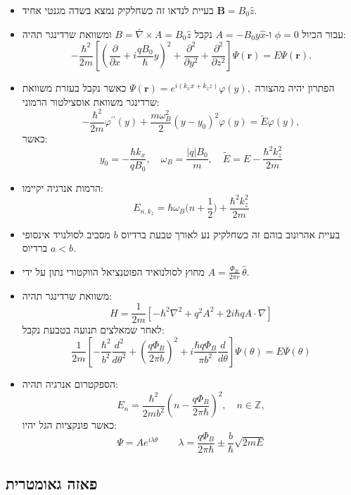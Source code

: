 \documentclass{tstextbook}
\begin{document}
\begin{summary}
  \begin{itemize}
    \item בעיית לנדאו זה כשחלקיק נמצא בשדה מגנטי אחיד \(\mathbf{B}=B_{0}\hat{z}\).
    \item עבור הכיול \(\phi=0\) ו-\(A=-B_{0}y\hat{x}\) נקבל \(B=\bar{\nabla} \times A=B_{0}\hat{z}\) ומשוואת שרדינגר תהיה:
$$-\frac{\hbar^{2}}{2m}\left[\left(\frac{\partial}{\partial x}+i\frac{q B_{0}}{\hbar}y\right)^{2}+\frac{\partial^{2}}{\partial y^{2}}+\frac{\partial^{2}}{\partial z^{2}}\right]\Psi(\mathbf{r})=E\Psi(\mathbf{r}).$$
    \item הפתרון יהיה מהצורה \(\Psi(\mathbf{r})=e^{i(k_{x}x+k_{z}z)}\varphi(y),\) כאשר נקבל בעזרת משוואת שרדינגר משוואת אוסצילטור הרמוני:
$$-\frac{\hbar^{2}}{2m}\varphi^{\prime\prime}(y)+\frac{m\omega_{B}^{2}}{2}(y-y_{0})^{2}\varphi(y)=\tilde{E}\varphi(y),$$
כאשר:
$$y_{0}=-\frac{\hbar k_{x}}{q B_{0}},\quad\omega_{B}=\frac{|q|B_{0}}{m},\quad\tilde{E}=E-\frac{\hbar^{2}k_{z}^{2}}{2m}$$
    \item הרמות אנרגיה יקיימו:
$$E_{n,k_{z}}=\hbar\omega_{B}\Big(n+\frac{1}{2}\Big)+\frac{\hbar^{2}k_{z}^{2}}{2m}$$
    \item בעיית אהרונוב בוהם זה כשחלקיק נע לאורך טבעת ברדיוס \(b\) מסביב לסולנויד אינסופי ברדיוס \(a<b\).
    \item מחוץ לסולנואיד הפוטנציאל הווקטורי נתון על ידי \(A=\frac{\Phi_{B}}{2\pi r}\,\hat{\theta}\).
    \item משוואת שרדינגר תהיה:
$$H=\frac{1}{2m}\left[-\hbar^{2}\nabla^{2}+q^{2}A^{2}+2i\hbar q A\cdot\nabla\right]$$
לאחר שמאלצים תנועה בטבעת נקבל:
$$\frac{1}{2m}\left[-\frac{\hbar^{2}}{b^{2}}\frac{d^{2}}{d\theta^{2}}+\left(\frac{q\Phi_{B}}{2\pi b}\right)^{2}+i\frac{\hbar q\Phi_{B}}{\pi b^{2}}\frac{d}{d\theta}\right]\Psi(\theta)=E\Psi(\theta)$$
    \item הספקטרום אנרגיה תהיה:
$$E_{n}=\frac{\hbar^{2}}{2m b^{2}}\left(n-\frac{q\Phi_{B}}{2\pi\hbar}\right)^{2},\quad n\in\mathbb{Z},$$
כאשר פונקציות הגל יהיו:
$$\Psi=A e^{i\lambda\theta}\qquad \lambda=\frac{q\Phi_{B}}{2\pi\hbar}\pm\frac{b}{\hbar}\sqrt{2m E}$$
  \end{itemize}
\end{summary}
\subsection{פאזה גאומטרית}
\end{document}
